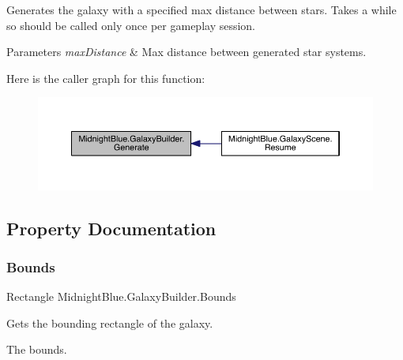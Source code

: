 Generates the galaxy with a specified max distance between stars. Takes a while so should be called only once per gameplay session. 


\begin{DoxyParams}{Parameters}
{\em max\+Distance} & Max distance between generated star systems.\\
\hline
\end{DoxyParams}
Here is the caller graph for this function\+:\nopagebreak
\begin{figure}[H]
\begin{center}
\leavevmode
\includegraphics[width=350pt]{class_midnight_blue_1_1_galaxy_builder_aaa080e0108cf02709137b7eebb56ad1a_icgraph}
\end{center}
\end{figure}


\subsection{Property Documentation}
\hypertarget{class_midnight_blue_1_1_galaxy_builder_a9051fa0f379b34dae5a6dcd287da7d9d}{}\label{class_midnight_blue_1_1_galaxy_builder_a9051fa0f379b34dae5a6dcd287da7d9d} 
\subsubsection{\texorpdfstring{Bounds}{Bounds}}
{\footnotesize\ttfamily Rectangle Midnight\+Blue.\+Galaxy\+Builder.\+Bounds\hspace{0.3cm}{\ttfamily [get]}}



Gets the bounding rectangle of the galaxy. 

The bounds.\hypertarget{class_midnight_blue_1_1_galaxy_builder_a4b496c6930a56d2469c21acb54ff23ec}{}\label{class_midnight_blue_1_1_galaxy_builder_a4b496c6930a56d2469c21acb54ff23ec} 
